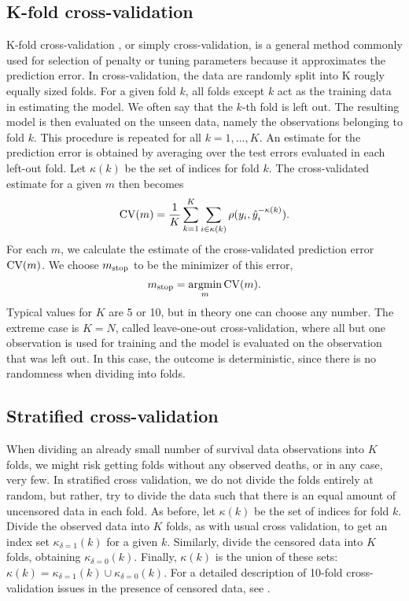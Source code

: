 \subsection{K-fold cross-validation}\label{subsec:K-fold}
K-fold cross-validation \citep{lachenbruch}, or simply cross-validation, is a general method commonly used for selection of penalty or tuning parameters because it approximates the prediction error.
In cross-validation, the data are randomly split into K rougly equally sized folds.
For a given fold $k$, all folds except $k$ act as the training data in estimating the model.
We often say that the $k$-th fold is left out.
The resulting model is then evaluated on the unseen data, namely the observations belonging to fold $k$.
This procedure is repeated for all $k=1,\ldots,K$.
An estimate for the prediction error is obtained by averaging over the test errors evaluated in each left-out fold. Let $\kappa(k)$ be the set of indices for fold $k$.
The cross-validated estimate for a given $m$ then becomes
\begin{equation}
    \operatorname{CV}(m)=\frac{1}{K}\sum_{k=1}^K\sum_{i\in\kappa(k)}\rho(y_i,\hat{y}_i^{-\kappa(k)}).
\end{equation}
For each $m$, we calculate the estimate of the cross-validated prediction error $\operatorname{CV}(m)$.
We choose $m_{\text{stop}}$ to be the minimizer of this error,
\begin{equation}
    m_{\text{stop}}=\operatorname*{argmin}_{m}\operatorname{CV}(m).
\end{equation}
Typical values for $K$ are 5 or 10, but in theory one can choose any number. The extreme case is $K=N$, called leave-one-out cross-validation, where all but one observation is used for training and the model is evaluated on the observation that was left out. In this case, the outcome is deterministic, since there is no randomness when dividing into folds.

\subsection{Stratified cross-validation}
When dividing an already small number of survival data observations into $K$ folds, we might risk getting folds without any observed deaths, or in any case, very few. In stratified cross validation, we do not divide the folds entirely at random, but rather, try to divide the data such that there is an equal amount of uncensored data in each fold.
As before, let $\kappa(k)$ be the set of indices for fold $k$.
Divide the observed data into $K$ folds, as with usual cross validation, to get an index set $\kappa_{\delta=1}(k)$ for a given $k$. 
Similarly, divide the censored data into $K$ folds, obtaining $\kappa_{\delta=0}(k)$.
Finally, $\kappa(k)$ is the union of these sets: $\kappa(k)=\kappa_{\delta=1}(k)\cup\kappa_{\delta=0}(k)$.
For a detailed description of 10-fold cross-validation issues in the presence of censored data, see \citet{kohavi}.

